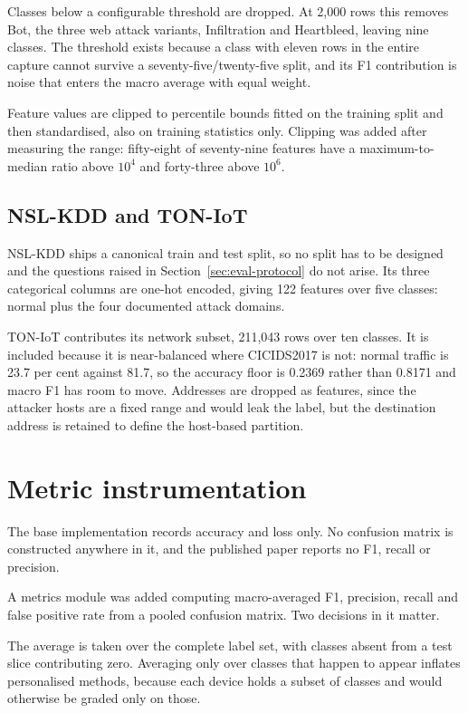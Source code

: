 Classes below a configurable threshold are dropped. At 2,000 rows this removes
Bot, the three web attack variants, Infiltration and Heartbleed, leaving nine
classes. The threshold exists because a class with eleven rows in the entire
capture cannot survive a seventy-five/twenty-five split, and its F1 contribution
is noise that enters the macro average with equal weight.

Feature values are clipped to percentile bounds fitted on the training split
and then standardised, also on training statistics only. Clipping was added
after measuring the range: fifty-eight of seventy-nine features have a
maximum-to-median ratio above $10^4$ and forty-three above $10^6$.

\subsection{NSL-KDD and TON-IoT}

NSL-KDD ships a canonical train and test split, so no split has to be designed
and the questions raised in Section~\ref{sec:eval-protocol} do not arise. Its
three categorical columns are one-hot encoded, giving 122 features over five
classes: normal plus the four documented attack domains.

TON-IoT contributes its network subset, 211,043 rows over ten classes. It is
included because it is near-balanced where CICIDS2017 is not: normal traffic is
23.7 per cent against 81.7, so the accuracy floor is 0.2369 rather than 0.8171
and macro F1 has room to move. Addresses are dropped as features, since the
attacker hosts are a fixed range and would leak the label, but the destination
address is retained to define the host-based partition.

\section{Metric instrumentation}
\label{sec:metrics-impl}

The base implementation records accuracy and loss only. No confusion matrix is
constructed anywhere in it, and the published paper reports no F1, recall or
precision.

A metrics module was added computing macro-averaged F1, precision, recall and
false positive rate from a pooled confusion matrix. Two decisions in it matter.

The average is taken over the complete label set, with classes absent from a
test slice contributing zero. Averaging only over classes that happen to appear
inflates personalised methods, because each device holds a subset of classes
and would otherwise be graded only on those.

